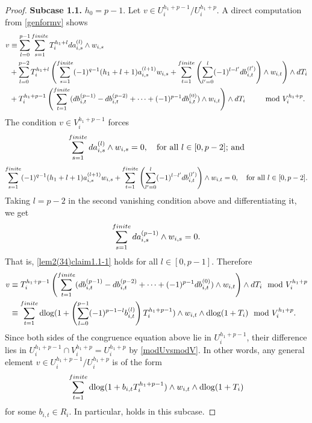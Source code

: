 \documentclass[11pt]{amsart}
\newcommand{\eq}[2]{\begin{equation}\label{#1}#2 \end{equation}}
\newcommand{\dlog}{\operatorname{dlog}}
\theoremstyle{plain}
\theoremstyle{definition}
\numberwithin{equation}{prop}
\begin{document}
\begin{proof}
\textbf{Subcase 1.1.} $h_0=p-1$.
Let
$v \in U^{h_1+p-1}_i/U_i^{h_1+p}$.
A direct computation from \eqref{genformv} shows
\begin{align*}
v&\equiv 
\sum_{l=0}^{p-1}\sum_{s=1}^{\rm finite}
T_i^{h_1+l}da_{i,s}^{(l)}\wedge w_{i,s}
\\&+
\sum_{l=0}^{p-2}
T_i^{h_1+l}
\left(
\sum_{s=1}^{\rm finite}
(-1)^{q-1}
(h_1+l+1) a_{i,s}^{(l+1)} w_{i,s}
+
\sum_{t=1}^{\rm finite}
\left(\sum_{l'=0}^{l} (-1)^{l-l'}db_{i,t}^{(l')}\right)
\wedge  w_{i,t}
\right)
\wedge dT_i
\\
&+
T_i^{h_1+p-1}
\left(\sum_{t=1}^{\rm finite}(db_{i,t}^{(p-1)}-db_{i,t}^{(p-2)}+\cdots +(-1)^{p-1}db_{i,t}^{(0)})\wedge  w_{i,t}\right)
\wedge dT_i
\qquad \mod V_i^{h_1+p}.
\end{align*}
The condition $v\in V_i^{h_1+p-1}$ forces
\eq{lem2(34)claim1.1-1}{\sum_{s=1}^{\rm finite}  da_{i,s}^{(l)}\wedge w_{i,s}=0,
\quad
\text{for all $l\in [0,p-2]$; and}}
\eq{lem2(34)claim1.1-2}{\sum_{s=1}^{\rm finite}
(-1)^{q-1} (h_1+l+1)a_{i,s}^{(l+1)} w_{i,s}
+
\sum_{t=1}^{\rm finite}
\left(\sum_{l'=0}^{l} (-1)^{l-l'}db_{i,t}^{(l')}\right)
\wedge  w_{i,t}
=0,
\quad
\text{for all $l\in [0,p-2]$.}}
Taking $l=p-2$ in the second vanishing condition above and differentiating it, we get
$$\sum_{s=1}^{\rm finite} 
da_{i,s}^{(p-1)}\wedge w_{i,s}
=0.$$
That is, \eqref{lem2(34)claim1.1-1} holds for all $l\in [0,p-1]$.
Therefore
\begin{align*}
v&\equiv 
T_i^{h_1+p-1}
\left(
\sum_{t=1}^{\rm finite}
(db_{i,t}^{(p-1)}-db_{i,t}^{(p-2)}+\cdots +(-1)^{p-1}db_{i,t}^{(0)})\wedge  w_{i,t}\right)
\wedge dT_i
\mod V_i^{h_1+p}
\\
&\equiv 
\sum_{t=1}^{\rm finite}
\dlog(1+
\left(\sum_{l=0}^{p-1} (-1)^{p-1-l}b_{i,t}^{(l)}\right)
T_i^{h_1+p-1})\wedge w_{i,t}\wedge \dlog (1+T_i)
\mod V_i^{h_1+p}.
\end{align*}
Since both sides of the congruence equation above lie in $U_i^{h_1+p-1}$, their difference lies in $U_i^{h_1+p-1}\cap V_i^{h_1+p}=U_i^{h_1+p}$ by \eqref{modUvsmodV}.
In other words, any general element $v\in U^{h_1+p-1}_i/U_i^{h_1+p}$ is of the form
$$
\sum_{t=1}^{\rm finite}
\dlog(1+b_{i,t}T_i^{h_1+p-1})\wedge w_{i,t}\wedge \dlog (1+T_i)
$$
for some $b_{i,t}\in R_i$.
In particular,  holds in this subcase.


\end{proof}
\end{document}
